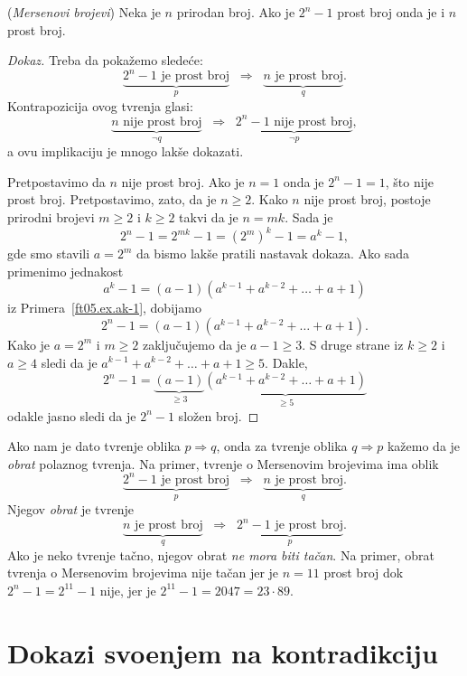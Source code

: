 \begin{EX} (\emph{Mersenovi brojevi})
  Neka je $n$ prirodan broj. Ako je $2^n - 1$ prost broj onda je i $n$ prost broj.
\end{EX}
\begin{proof}[Dokaz]
  Treba da poka\v zemo slede\'ce:
  $$
    \underbrace{2^n - 1 \text{ je prost broj}}_p
    \;\;\Rightarrow\;\;
    \underbrace{n \text{ je prost broj}}_q.
  $$
  Kontrapozicija ovog tvr\dj enja glasi:
  $$
    \underbrace{n \text{ nije prost broj}}_{\lnot q}
    \;\;\Rightarrow\;\;
    \underbrace{2^n - 1 \text{ nije prost broj}}_{\lnot p},
  $$
  a ovu implikaciju je mnogo lak\v se dokazati.
  
  Pretpostavimo da $n$ nije prost broj. Ako je $n = 1$ onda je $2^n - 1 = 1$, \v sto nije prost broj.
  Pretpostavimo, zato, da je $n \ge 2$. Kako $n$ nije prost broj, postoje prirodni brojevi $m \ge 2$ i $k \ge 2$
  takvi da je $n = mk$. Sada je
  $$
    2^n - 1 = 2^{mk} - 1 = (2^m)^k - 1 = a^k - 1,
  $$
  gde smo stavili $a = 2^m$ da bismo lak\v se pratili nastavak dokaza.
  Ako sada primenimo jednakost
  $$
    a^k - 1 = (a - 1)(a^{k-1} + a^{k-2} + \ldots + a + 1)
  $$
  iz Primera~\ref{ft05.ex.ak-1}, dobijamo
  $$
    2^n - 1 = (a - 1)(a^{k-1} + a^{k-2} + \ldots + a + 1).
  $$
  Kako je $a = 2^m$ i $m \ge 2$ zaklju\v cujemo da je $a - 1 \ge 3$. S druge strane iz $k \ge 2$ i $a \ge 4$ sledi da je
  $a^{k-1} + a^{k-2} + \ldots + a + 1 \ge 5$. Dakle,
  $$
    2^n - 1 = \underbrace{(a - 1)}_{\ge 3}\underbrace{(a^{k-1} + a^{k-2} + \ldots + a + 1)}_{\ge 5}
  $$
  odakle jasno sledi da je $2^n - 1$ slo\v zen broj.
\end{proof}

Ako nam je dato tvr\dj enje oblika $p \Rightarrow q$, onda za tvr\dj enje oblika $q \Rightarrow p$ ka\v zemo
da je \emph{obrat} polaznog tvr\dj enja. Na primer, tvr\dj enje o Mersenovim brojevima ima oblik
$$
  \underbrace{2^n - 1 \text{ je prost broj}}_p
  \;\;\Rightarrow\;\;
  \underbrace{n \text{ je prost broj}}_q.
$$
Njegov \emph{obrat} je tvr\dj enje
$$
  \underbrace{n \text{ je prost broj}}_q
  \;\;\Rightarrow\;\;
  \underbrace{2^n - 1 \text{ je prost broj}}_p.
$$
Ako je neko tvr\dj enje ta\v cno, njegov obrat \emph{ne mora biti ta\v can}. Na primer,
obrat tvr\dj enja o Mersenovim brojevima nije ta\v can jer je $n = 11$ prost broj
dok $2^n - 1 = 2^{11} - 1$ nije, jer je $2^{11} - 1 = 2047 = 23 \cdot 89$.

\section{Dokazi svo\dj enjem na kontradikciju}

